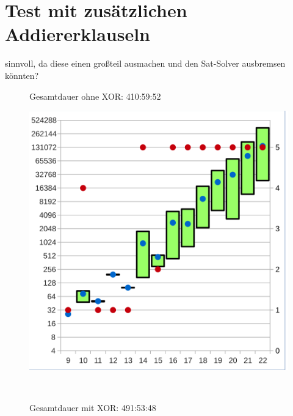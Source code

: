\section{Test mit zusätzlichen Addiererklauseln}

sinnvoll, da diese einen großteil ausmachen und den Sat-Solver ausbremsen könnten?


\begin{figure}[!h]
  \centering
  \begin{minipage}[c]{0.45\textwidth}
  \begin{flushleft}Gesamtdauer ohne XOR: 410:59:52\end{flushleft}
  \includegraphics[scale=0.55]{images/data_add_knf}
  \end{minipage}
  \begin{minipage}[c]{0.09\textwidth}
  ~~
  \end{minipage}
  \begin{minipage}[c]{0.45\textwidth}
  \begin{flushleft}Gesamtdauer mit XOR: 491:53:48\end{flushleft}

\end{minipage}
\end{figure}
